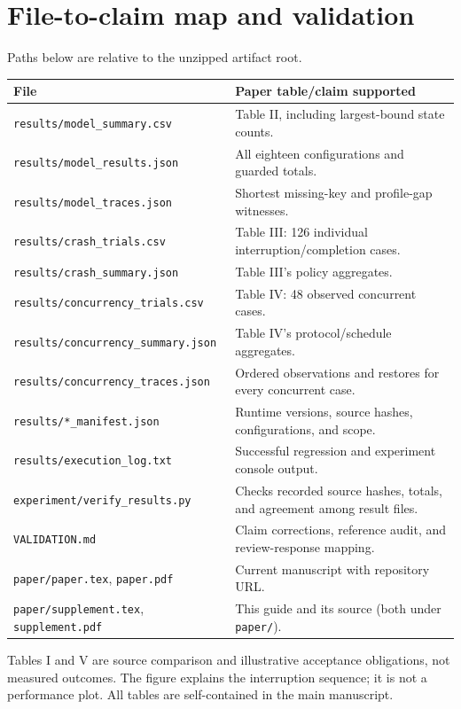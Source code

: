 \documentclass[10pt]{article}
\begin{document}
\newpage
\section{File-to-claim map and validation}
Paths below are relative to the unzipped artifact root.
\begin{center}\begin{tabular}{@{}p{6.6cm}p{8.7cm}@{}}
\toprule
File & Paper table/claim supported\\
\midrule
\texttt{results/model\_summary.csv} & Table II, including largest-bound state counts.\\
\texttt{results/model\_results.json} & All eighteen configurations and guarded totals.\\
\texttt{results/model\_traces.json} & Shortest missing-key and profile-gap witnesses.\\
\texttt{results/crash\_trials.csv} & Table III: 126 individual interruption/completion cases.\\
\texttt{results/crash\_summary.json} & Table III's policy aggregates.\\
\texttt{results/concurrency\_trials.csv} & Table IV: 48 observed concurrent cases.\\
\texttt{results/concurrency\_summary.json} & Table IV's protocol/schedule aggregates.\\
\texttt{results/concurrency\_traces.json} & Ordered observations and restores for every concurrent case.\\
\texttt{results/*\_manifest.json} & Runtime versions, source hashes, configurations, and scope.\\
\texttt{results/execution\_log.txt} & Successful regression and experiment console output.\\
\texttt{experiment/verify\_results.py} & Checks recorded source hashes, totals, and agreement among result files.\\
\texttt{VALIDATION.md} & Claim corrections, reference audit, and review-response mapping.\\
\texttt{paper/paper.tex}, \texttt{paper.pdf} & Current manuscript with repository URL.\\
\texttt{paper/supplement.tex}, \texttt{supplement.pdf} & This guide and its source (both under \texttt{paper/}).\\
\bottomrule\end{tabular}\end{center}
Tables I and V are source comparison and illustrative acceptance obligations,
not measured outcomes. The figure explains the interruption sequence; it is not
a performance plot. All tables are self-contained in the main manuscript.
\end{document}
